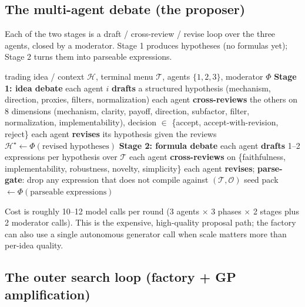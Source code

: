 \documentclass[11pt]{article}
\theoremstyle{definition}
\theoremstyle{plain}
\theoremstyle{remark}
\newcommand{\Term}{\mathcal{T}}
\newcommand{\Op}{\mathcal{O}}
\begin{document}
\subsection{The multi-agent debate (the proposer)}

Each of the two stages is a draft / cross-review / revise loop over the three agents,
closed by a moderator. Stage 1 produces hypotheses (no formulas yet); Stage 2 turns
them into parseable expressions.

\begin{algorithm}[h]
\caption{Two-stage debate: idea $\to$ formula (one full proposal round)}
\begin{algorithmic}[1]
\Require trading idea / context $\mathcal{H}$, terminal menu $\Term$, agents $\{1,2,3\}$, moderator $\Phi$
\Statex \textbf{Stage 1: idea debate}
\State each agent $i$ \textbf{drafts} a structured hypothesis (mechanism, direction, proxies, filters, normalization)
\State each agent \textbf{cross-reviews} the others on 8 dimensions (mechanism, clarity, payoff, direction, subfactor, filter, normalization, implementability), decision $\in$ \{accept, accept-with-revision, reject\}
\State each agent \textbf{revises} its hypothesis given the reviews
\State $\mathcal{H}^\star \gets \Phi(\text{revised hypotheses})$ 
\Statex \textbf{Stage 2: formula debate}
\State each agent \textbf{drafts} 1--2 expressions per hypothesis over $\Term$
\State each agent \textbf{cross-reviews} on \{faithfulness, implementability, robustness, novelty, simplicity\}
\State each agent \textbf{revises}; \textbf{parse-gate}: drop any expression that does not compile against $(\Term,\Op)$
\State \Return seed pack $\gets \Phi(\text{parseable expressions})$ 
\end{algorithmic}
\end{algorithm}

Cost is roughly 10--12 model calls per round (3 agents $\times$ 3 phases $\times$ 2
stages plus 2 moderator calls). This is the expensive, high-quality proposal path; the
factory can also use a single autonomous generator call when scale matters more than
per-idea quality.

\subsection{The outer search loop (factory + GP amplification)}
\end{document}
